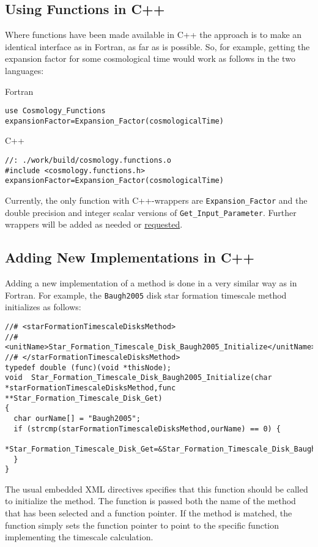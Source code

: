 \subsection{Using Functions in C++}

Where functions have been made available in C++ the approach is to make an identical interface as in Fortran, as far as is possible. So, for example, getting the expansion factor for some cosmological time would work as follows in the two languages:

\noindent Fortran
\begin{verbatim}
use Cosmology_Functions
expansionFactor=Expansion_Factor(cosmologicalTime)
\end{verbatim}

\noindent C++
\begin{verbatim}
//: ./work/build/cosmology.functions.o
#include <cosmology.functions.h>
expansionFactor=Expansion_Factor(cosmologicalTime)
\end{verbatim}

Currently, the only function with C++-wrappers are {\tt Expansion\_Factor} and the double precision and integer scalar versions of {\tt Get\_Input\_Parameter}. Further wrappers will be added as needed or \href{mailto:abenson@obs.carnegiescience.edu}{requested}.

\subsection{Adding New Implementations in C++}

Adding a new implementation of a method is done in a very similar way as in Fortran. For example, the {\tt Baugh2005} disk star formation timescale method initializes as follows:

\begin{verbatim}
//# <starFormationTimescaleDisksMethod>
//#  <unitName>Star_Formation_Timescale_Disk_Baugh2005_Initialize</unitName>
//# </starFormationTimescaleDisksMethod>
typedef double (func)(void *thisNode);
void  Star_Formation_Timescale_Disk_Baugh2005_Initialize(char *starFormationTimescaleDisksMethod,func **Star_Formation_Timescale_Disk_Get)
{
  char ourName[] = "Baugh2005";
  if (strcmp(starFormationTimescaleDisksMethod,ourName) == 0) {
    *Star_Formation_Timescale_Disk_Get=&Star_Formation_Timescale_Disk_Baugh2005;
  }
}
\end{verbatim}
The usual embedded XML directives specifies that this function should be called to initialize the method. The function is passed both the name of the method that has been selected and a function pointer. If the method is matched, the function simply sets the function pointer to point to the specific function implementing the timescale calculation.

